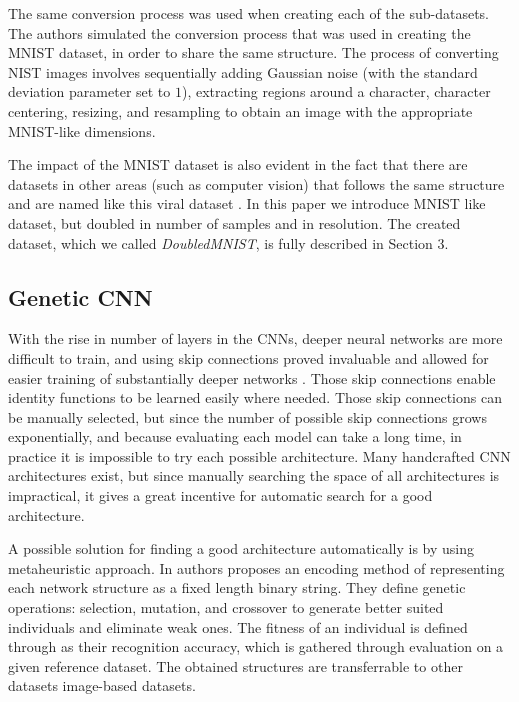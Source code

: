 \documentclass[eng]{simposium}
\begin{document}
The same conversion process was used when creating each of the sub-datasets.  
The authors simulated the conversion process that was used in creating the MNIST dataset, in order  
to share the same structure.  
The process of converting NIST images involves sequentially adding Gaussian noise (with the standard deviation parameter set to $1$),  
extracting regions around a character, character centering, resizing, and resampling to obtain an image with the appropriate MNIST-like dimensions.  

The impact of the MNIST dataset is also evident in the fact that there are datasets in other areas (such as computer vision) that 
follows the same structure and are named like this viral dataset \cite{27}.  
In this paper we introduce MNIST like dataset, but doubled in number of samples and in resolution.  
The created dataset, which we called \textit{DoubledMNIST}, is fully described in Section 3.  

\subsection{Genetic CNN} 

With the rise in number of layers in the CNNs, deeper neural networks are more difficult to train, and using skip connections proved invaluable and allowed  
for easier training of substantially deeper networks \cite{6}. Those skip connections enable identity functions to be learned easily where needed. 
Those skip connections can be manually selected, but since the number of possible skip connections grows exponentially, and because evaluating each model can take a long time,  
in practice it is impossible to try each possible architecture. 
Many handcrafted CNN architectures exist, but since manually searching the space of all architectures is impractical, it gives a great incentive for automatic search  
for a good architecture. 

A possible solution for finding a good architecture automatically is by using metaheuristic approach.  
In \cite{4} authors proposes an encoding method of representing each network structure as a fixed length binary string.  
They define genetic operations: selection, mutation, and crossover to generate better suited individuals and eliminate weak ones. 
The fitness of an individual is defined through as their recognition accuracy, which is gathered through evaluation on a given reference dataset. 
The obtained structures are transferrable to other datasets image-based datasets. 
\end{document}

